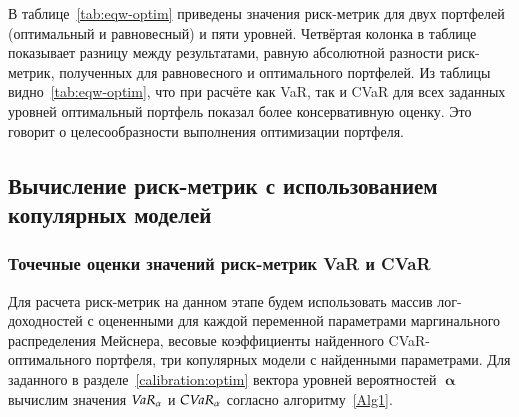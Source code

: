 В таблице~\ref{tab:eqw-optim} приведены значения риск-метрик для двух портфелей (оптимальный и равновесный) и пяти уровней. 
Четвёртая колонка в таблице показывает разницу между результатами, равную абсолютной разности риск-метрик, полученных для равновесного и оптимального портфелей. 
Из таблицы видно~\ref{tab:eqw-optim}, что при расчёте как VaR, так и CVaR для всех заданных уровней оптимальный портфель показал более консервативную оценку.
Это говорит о целесообразности выполнения оптимизации портфеля.

\subsection{Вычисление риск-метрик с использованием копулярных моделей}
\label{results:risk-measures}


\subsubsection{Точечные оценки значений риск-метрик VaR и CVaR}

Для расчета риск-метрик на данном этапе будем использовать массив лог-доходностей с оцененными  для каждой переменной параметрами маргинального распределения Мейснера, весовые коэффициенты найденного CVaR-оптимального портфеля, три копулярных модели с найденными параметрами.
Для заданного в разделе~\ref{calibration:optim} вектора уровней вероятностей $\pmb{\upalpha}$ вычислим значения $\emph{VaR}_\alpha$ и $\emph{CVaR}_\alpha$ согласно алгоритму~\ref{Alg1}.


